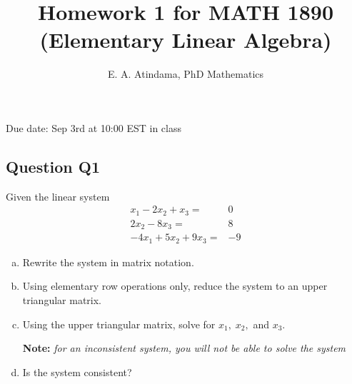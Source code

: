 \documentclass[a4paper,11pt,reqno]{amsart}
\title[MATH 1890 (Elementary Linear Algebra)]{Homework 1 for MATH 1890 (Elementary Linear Algebra)}
\author[Emmanuel Atindama]{E. A. Atindama, PhD Mathematics}
\numberwithin{equation}{section}
\begin{document}
\maketitle

Due date: Sep 3rd at 10:00 EST in class

\subsection{Question Q1}\label{sec:q1}

Given the linear system
    \begin{align*}
        x_1 - 2x_2 + x_3 =& 0\\
           2x_2 - 8x_3  =& 8\\
         -4x_1 + 5x_2 + 9x_3 =& -9
    \end{align*}
\begin{enumerate}[a)]
    \item Rewrite the system in matrix notation.
    \item Using elementary row operations only, reduce the system to an upper triangular matrix.
    \item Using the upper triangular matrix, solve for \(x_1,\; x_2,\) and \(x_3\).
    
    \textbf{Note:} \emph{for an inconsistent system, you will not be able to solve the system}
    
    \item Is the system consistent?
\end{enumerate}
\end{document}
